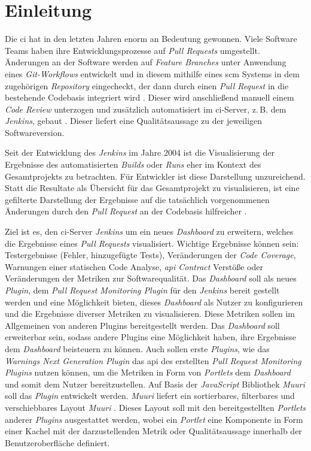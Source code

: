\chapter{Einleitung}
\label{chap:einleitung}

Die \acf{ci} hat in den letzten Jahren enorm an Bedeutung gewonnen. Viele Software Teams haben ihre Entwicklungsprozesse auf \textit{Pull Requests} umgestellt. Änderungen an der Software werden auf \textit{Feature Branches} unter Anwendung eines \textit{Git-Workflows} entwickelt und in diesem mithilfe eines \acf{scm} Systems in dem zugehörigen \textit{Repository} eingecheckt, der dann durch einen \textit{Pull Request} in die bestehende Codebasis integriert wird \citep{fowler_2021}. Dieser wird anschließend manuell einem \textit{Code Review} unterzogen und zusätzlich automatisiert im \ac{ci}-Server, z.\,B. dem \textit{Jenkins}, gebaut \citep{ausschreibung}. Dieser liefert eine Qualitätsaussage zu der jeweiligen Softwareversion.

Seit der Entwicklung des \textit{Jenkins} im Jahre 2004 ist die Visualisierung der Ergebnisse des automatisierten \textit{Builds} oder \textit{Runs} eher im Kontext des Gesamtprojekts zu betrachten. Für Entwickler ist diese Darstellung unzureichend. Statt die Resultate als Übersicht für das Gesamtprojekt zu visualisieren, ist eine gefilterte Darstellung der Ergebnisse auf die tatsächlich vorgenommenen Änderungen durch den \textit{Pull Request} an der Codebasis hilfreicher \citep{ausschreibung}.

Ziel ist es, den \ac{ci}-Server \textit{Jenkins} um ein neues \textit{Dashboard} zu erweitern, welches die Ergebnisse eines \textit{Pull Requests} visualisiert. Wichtige Ergebnisse können sein: Testergebnisse (Fehler, hinzugefügte Tests), Veränderungen der \textit{Code Coverage}, Warnungen einer statischen Code Analyse, \textit{\acs{api} Contract} Verstöße oder Veränderungen der Metriken zur Softwarequalität. 
Das \textit{Dashboard} soll als neues \textit{Plugin}, dem \textit{Pull Request Monitoring Plugin} \citep{pull-request-monitoring-plugin} für den \textit{Jenkins} bereit gestellt werden und eine Möglichkeit bieten, dieses \textit{Dashboard} als Nutzer zu konfigurieren und die Ergebnisse diverser Metriken zu visualisieren. Diese Metriken sollen im Allgemeinen von anderen Plugins bereitgestellt werden. Das \textit{Dashboard} soll erweiterbar sein, sodass andere Plugins eine Möglichkeit haben, ihre Ergebnisse dem \textit{Dashboard} beisteuern zu können. Auch sollen erste \textit{Plugins}, wie das \textit{Warnings Next Generation Plugin} \citep{warnings-ng-plugin} das \ac{api} des erstellten \textit{Pull Request Monitoring Plugins} nutzen können, um die Metriken in Form von \textit{Portlets} dem \textit{Dashboard} und somit dem Nutzer bereitzustellen.
Auf Basis der \textit{JavaScript} Bibliothek \textit{Muuri} soll das \textit{Plugin} entwickelt werden. \textit{Muuri} liefert ein sortierbares, filterbares und verschiebbares Layout \textit{Muuri} \citep{muuri}. Dieses Layout soll mit den bereitgestellten \textit{Portlets} anderer \textit{Plugins} ausgestattet werden, wobei ein \textit{Portlet} eine Komponente in Form einer Kachel mit der darzustellenden Metrik oder Qualitätsaussage innerhalb der Benutzeroberfläche definiert.

